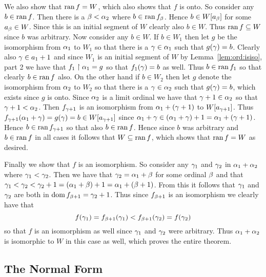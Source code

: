 \begin{questions}
{{    We also show that $\mathrm{ran}\, f = W$, which also shows that $f$ is onto.
    So consider any $b \in \mathrm{ran}\, f$.
    Then there is a $\beta < \alpha_2$ where $b \in \mathrm{ran}\, f_\beta$.
    Hence $b \in W[a_\beta]$ for some $a_\beta \in W$.
    Since this is an initial segment of $W$ clearly also $b \in W$.
    Thus $\mathrm{ran}\, f \subseteq W$ since $b$ was arbitrary.
    Now consider any $b \in W$.
    If $b \in W_1$ then let $g$ be the isomorphism from $\alpha_1$ to $W_1$ so that there is a $\gamma \in \alpha_1$ such that $g(\gamma) = b$.
    Clearly also $\gamma \in a_1 + 1$ and since $W_1$ is an initial segment of $W$ by Lemma~\ref{lem:ord:isiso}, part 2 we have that $f_1 \restriction \alpha_1 = g$ so that $f_1(\gamma) = b$ as well.
    Thus $b \in \mathrm{ran}\, f_1$ so that clearly $b \in \mathrm{ran}\, f$ also.
    On the other hand if $b \in W_2$ then let $g$ denote the isomorphism from $\alpha_2$ to $W_2$ so that there is a $\gamma \in \alpha_2$ such that $g(\gamma) = b$, which exists since $g$ is onto.
    Since $\alpha_2$ is a limit ordinal we have that $\gamma+1 \in \alpha_2$ so that $\gamma+1 < \alpha_2$.
    Then $f_{\gamma+1}$ is an isomorphism from $\alpha_1 + (\gamma+1)$ to $W[a_{\gamma+1}]$.
    Thus $f_{\gamma+1}(\alpha_1 + \gamma) = g(\gamma) = b \in W[a_{\gamma+1}]$ since $\alpha_1 + \gamma \in (\alpha_1 + \gamma) + 1 = \alpha_1 + (\gamma+1)$.
    Hence $b \in \mathrm{ran}\, f_{\gamma+1}$ so that also $b \in \mathrm{ran}\, f$.
    Hence since $b$ was arbitrary and $b \in \mathrm{ran}\, f$ in all cases it follows that $W \subseteq \mathrm{ran}\, f$, which shows that $\mathrm{ran}\, f = W$ as desired.
    
    Finally we show that $f$ is an isomorphism.
    So consider any $\gamma_1$ and $\gamma_2$ in $\alpha_1 + \alpha_2$ where $\gamma_1 < \gamma_2$.
    Then we have that $\gamma_2 = \alpha_1 + \beta$ for some ordinal $\beta$ and that $\gamma_1 < \gamma_2 < \gamma_2 + 1 = (\alpha_1 + \beta) + 1 = \alpha_1 + (\beta + 1)$.
    From this it follows that $\gamma_1$ and $\gamma_2$ are both in $\mathrm{dom}\, f_{\beta+1} = \gamma_2 + 1$.
    Thus since $f_{\beta+1}$ is an isomorphism we clearly have that
    $$
    f(\gamma_1) = f_{\beta+1}(\gamma_1) < f_{\beta+1}(\gamma_2)= f(\gamma_2)
    $$
    so that $f$ is an isomorphism as well since $\gamma_1$ and $\gamma_2$ were arbitrary.
    Thus $\alpha_1 + \alpha_2$ is isomorphic to $W$ in this case as well, which proves the entire theorem.
  }
}

\subsection{The Normal Form}


\end{questions}
